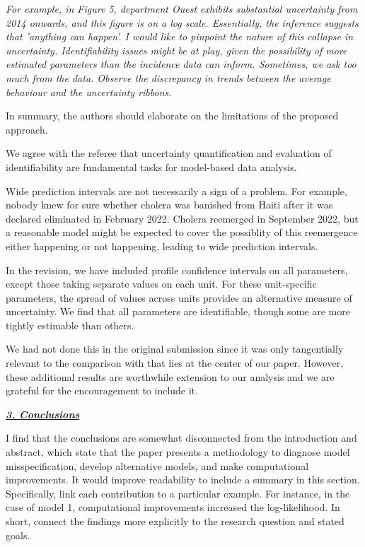 \documentclass[11pt]{article}
\newcommand\report[1]{{\color{mygreen} \vspace{1mm}\hspace{0.25in}\parbox{6in}{\em #1}}}
\begin{document}
\report{
For example, in Figure 5, department Ouest exhibits substantial uncertainty from 2014 onwards, and this figure is on a log scale. Essentially, the inference suggests that 'anything can happen'. I would like to pinpoint the nature of this collapse in uncertainty. Identifiability issues might be at play, given the possibility of more estimated parameters than the incidence data can inform. Sometimes, we ask too much from the data. Observe the discrepancy in trends between the average behaviour and the uncertainty ribbons.

In summary, the authors should elaborate on the limitations of the proposed approach.
}

We agree with the referee that uncertainty quantification and evaluation of identifiability are fundamental tasks for model-based data analysis.

Wide prediction intervals are not necessarily a sign of a problem.
For example, nobody knew for sure whether cholera was banished from Haiti after it was declared eliminated in February 2022.
Cholera reemerged in September 2022, but a reasonable model might be expected to cover the possiblity of this reemergence either happening or not happening, leading to wide prediction intervals.

In the revision, we have included profile confidence intervals on all parameters, except those taking separate values on each unit.
For these unit-specific parameters, the spread of values across units provides an alternative measure of uncertainty.
We find that all parameters are identifiable, though some are more tightly estimable than others.

We had not done this in the original submission since it was only tangentially relevant to the comparison with \cite{lee20} that lies at the center of our paper.
However, these additional results are worthwhile extension to our analysis and we are grateful for the encouragement to include it.


\report{
  \textbf{\underline{3. Conclusions}}

  I find that the conclusions are somewhat disconnected from the introduction and abstract, which state that the paper presents a methodology to diagnose model misspecification, develop alternative models, and make computational improvements. It would improve readability to include a summary in this section. Specifically, link each contribution to a particular example. For instance, in the case of model 1, computational improvements increased the log-likelihood. In short, connect the findings more explicitly to the research question and stated goals.
}
\end{document}
